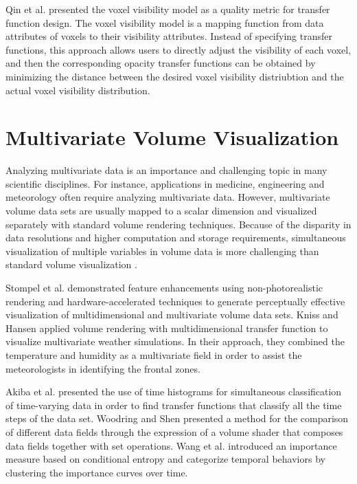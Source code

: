 Qin et al. \cite{qin_voxel_2015} presented the voxel visibility model as a quality metric for transfer function design.
The voxel visibility model is a mapping function from data attributes of voxels to their visibility attributes. Instead of specifying transfer functions, this approach allows users to directly adjust the visibility of each voxel, and then the corresponding opacity transfer functions can be obtained by minimizing the distance between the desired voxel visibility distriubtion and the actual voxel visibility distribution.

\section{Multivariate Volume Visualization}
Analyzing multivariate data is an importance and challenging topic in many scientific disciplines. For instance, applications in medicine, engineering and meteorology often require analyzing multivariate data.
However, multivariate volume data sets are usually mapped to a scalar dimension and visualized separately with standard volume rendering techniques. Because of the disparity in data resolutions and higher computation and storage requirements, simultaneous visualization of multiple variables in volume data is more challenging than standard volume visualization \cite{wilson_interactive_2002}.


Stompel et al. \cite{stompel_visualization_2002} demonstrated feature enhancements using non-photorealistic rendering and hardware-accelerated techniques to generate perceptually effective visualization of multidimensional and multivariate volume data sets.
Kniss and Hansen \cite{kniss_volume_2002} applied volume rendering with multidimensional transfer function to visualize multivariate weather simulations. In their approach, they combined the temperature and humidity as a multivariate field in order to assist the meteorologists in identifying the frontal zones. 

Akiba et al. \cite{akiba_simultaneous_2006} presented the use of time histograms for simultaneous classification of time-varying data in order to find transfer functions that classify all the time steps of the data set.
Woodring and Shen \cite{woodring_multi-variate_2006} presented a method for the comparison of different data fields through the expression of a volume shader that composes data fields together with set operations.
Wang et al. \cite{wang_importance-driven_2008} introduced an importance measure based on conditional entropy and categorize temporal behaviors by clustering the importance curves over time.

